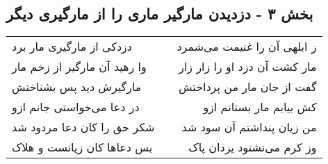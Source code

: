 \begin{center}
\section*{بخش ۳ - دزدیدن مارگیر ماری را از مارگیری دیگر}
\label{sec:sh003}
\begin{longtable}{l p{0.5cm} r}
دزدکی از مارگیری مار برد
&&
ز ابلهی آن را غنیمت می‌شمرد
\\
وا رهید آن مارگیر از زخم مار
&&
مار کشت آن دزد او را زار زار
\\
مارگیرش دید پس بشناختش
&&
گفت از جان مار من پرداختش
\\
در دعا می‌خواستی جانم ازو
&&
کش بیابم مار بستانم ازو
\\
شکر حق را کان دعا مردود شد
&&
من زیان پنداشتم آن سود شد
\\
بس دعاها کان زیانست و هلاک
&&
وز کرم می‌نشنود یزدان پاک
\\
\end{longtable}
\end{center}
